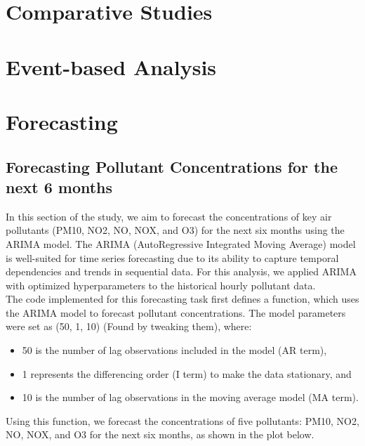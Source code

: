 \documentclass{modeleRapport}
\begin{document}
\section{Comparative Studies}



\section{Event-based Analysis}




\section{Forecasting}

\subsection{Forecasting Pollutant Concentrations for the next 6 months}

In this section of the study, we aim to forecast the concentrations of key air pollutants (PM10, NO2, NO, NOX, and O3) 
for the next six months using the ARIMA model. The ARIMA (AutoRegressive Integrated Moving Average) model is well-suited 
for time series forecasting due to its ability to capture temporal dependencies and trends in sequential data. For 
this analysis, we applied ARIMA with optimized hyperparameters to the historical hourly pollutant data.\\

The code implemented for this forecasting task first defines a function, which uses the ARIMA model to 
forecast pollutant concentrations. The model parameters were set as (50, 1, 10) (Found by tweaking them), where:\\

\begin{itemize}
    \item 50 is the number of lag observations included in the model (AR term),
    \item 1 represents the differencing order (I term) to make the data stationary, and
    \item 10 is the number of lag observations in the moving average model (MA term).\\
\end{itemize}

Using this function, we forecast the concentrations of five pollutants: PM10, NO2, NO, NOX, and O3 for the next six months, 
as shown in the plot below.
\end{document}
